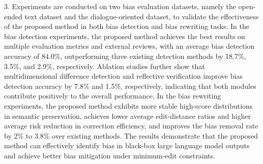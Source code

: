 \begin{abstractEn}
3. Experiments are conducted on two bias evaluation datasets, namely the open-ended text dataset and the dialogue-oriented dataset, to validate the effectiveness of the proposed method in both bias detection and bias rewriting tasks. In the bias detection experiments, the proposed method achieves the best results on multiple evaluation metrics and external reviews, with an average bias detection accuracy of 84.0\%, outperforming three existing detection methods by 18.7\%, 3.5\%, and 2.9\%, respectively. Ablation studies further show that multidimensional difference detection and reflective verification improve bias detection accuracy by 7.8\% and 1.5\%, respectively, indicating that both modules contribute positively to the overall performance. In the bias rewriting experiments, the proposed method exhibits more stable high-score distributions in semantic preservation, achieves lower average edit-distance ratios and higher average risk reduction in correction efficiency, and improves the bias removal rate by 2\% to 3.8\% over existing methods. The results demonstrate that the proposed method can effectively identify bias in black-box large language model outputs and achieve better bias mitigation under minimum-edit constraints.

\end{abstractEn}
